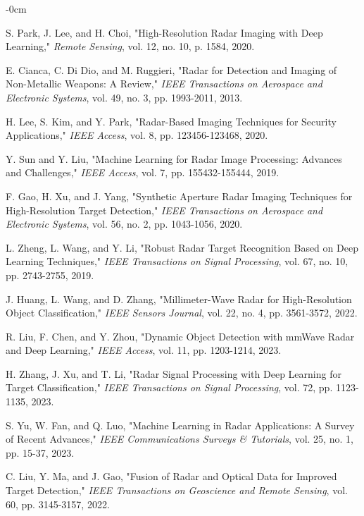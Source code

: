 \documentclass[journal,article,submit,pdftex,moreauthors]{Definitions/mdpi}
\begin{document}
\begin{adjustwidth}{-\extralength}{0cm}
\begin{thebibliography}{999}
S. Park, J. Lee, and H. Choi, "High-Resolution Radar Imaging with Deep Learning," \textit{Remote Sensing}, vol. 12, no. 10, p. 1584, 2020.

E. Cianca, C. Di Dio, and M. Ruggieri, "Radar for Detection and Imaging of Non-Metallic Weapons: A Review," \textit{IEEE Transactions on Aerospace and Electronic Systems}, vol. 49, no. 3, pp. 1993-2011, 2013.

H. Lee, S. Kim, and Y. Park, "Radar-Based Imaging Techniques for Security Applications," \textit{IEEE Access}, vol. 8, pp. 123456-123468, 2020.

Y. Sun and Y. Liu, "Machine Learning for Radar Image Processing: Advances and Challenges," \textit{IEEE Access}, vol. 7, pp. 155432-155444, 2019.

F. Gao, H. Xu, and J. Yang, "Synthetic Aperture Radar Imaging Techniques for High-Resolution Target Detection," \textit{IEEE Transactions on Aerospace and Electronic Systems}, vol. 56, no. 2, pp. 1043-1056, 2020.

L. Zheng, L. Wang, and Y. Li, "Robust Radar Target Recognition Based on Deep Learning Techniques," \textit{IEEE Transactions on Signal Processing}, vol. 67, no. 10, pp. 2743-2755, 2019.

J. Huang, L. Wang, and D. Zhang, "Millimeter-Wave Radar for High-Resolution Object Classification," \textit{IEEE Sensors Journal}, vol. 22, no. 4, pp. 3561-3572, 2022.

R. Liu, F. Chen, and Y. Zhou, "Dynamic Object Detection with mmWave Radar and Deep Learning," \textit{IEEE Access}, vol. 11, pp. 1203-1214, 2023.

H. Zhang, J. Xu, and T. Li, "Radar Signal Processing with Deep Learning for Target Classification," \textit{IEEE Transactions on Signal Processing}, vol. 72, pp. 1123-1135, 2023.

S. Yu, W. Fan, and Q. Luo, "Machine Learning in Radar Applications: A Survey of Recent Advances," \textit{IEEE Communications Surveys \& Tutorials}, vol. 25, no. 1, pp. 15-37, 2023.

C. Liu, Y. Ma, and J. Gao, "Fusion of Radar and Optical Data for Improved Target Detection," \textit{IEEE Transactions on Geoscience and Remote Sensing}, vol. 60, pp. 3145-3157, 2022.


\end{thebibliography}
\end{adjustwidth}
\end{document}
